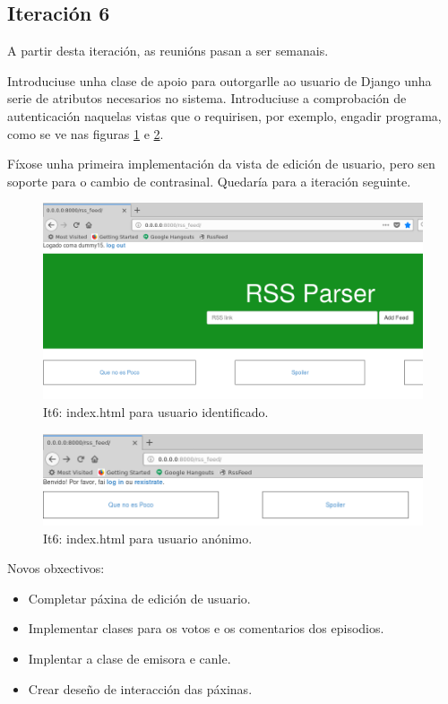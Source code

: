 \subsection{Iteración 6}

A partir desta iteración, as reunións pasan a ser semanais.

Introduciuse unha clase de apoio para outorgarlle ao usuario de Django unha serie de atributos necesarios no sistema. Introduciuse a comprobación de autenticación naquelas vistas que o requirisen, por exemplo, engadir programa, como se ve nas figuras \ref{fig:it6_log} e \ref{fig:it6_anon}.

Fíxose unha primeira implementación da vista de edición de usuario, pero sen soporte para o cambio de contrasinal. Quedaría para a iteración seguinte.

\begin{figure}[h]
	\centering
	\includegraphics[scale=0.4,keepaspectratio=true]{./images/it6_log.png}
	\caption{It6: index.html para usuario identificado.}
	\label{fig:it6_log}
\end{figure}

\begin{figure}[h]
	\centering
	\includegraphics[scale=0.5,keepaspectratio=true]{./images/it6_anon.png}
	\caption{It6: index.html para usuario anónimo.}
	\label{fig:it6_anon}
\end{figure}

Novos obxectivos:
\begin{itemize}
	\item Completar páxina de edición de usuario.
	\item Implementar clases para os votos e os comentarios dos episodios.
	\item Implentar a clase de emisora e canle.
	\item Crear deseño de interacción das páxinas.
\end{itemize}

